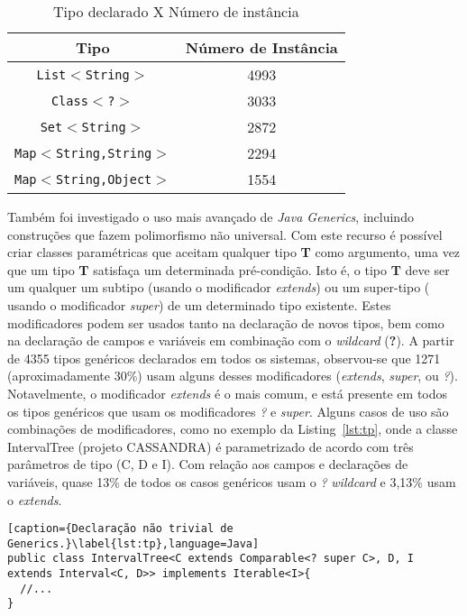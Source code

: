 \begin{table}[ht]
	\centering
	\caption{Tipo declarado X Número de instância}
	\begin{tabular}{cc}
		\hline
		Tipo & Número de Instância\\ 
		\hline \hline
		\texttt{List$<$String$>$} & 4993 \\ 
		\texttt{Class$<$?$>$} & 3033 \\ 
		\texttt{Set$<$String$>$} & 2872 \\ 
		\texttt{Map$<$String,String$>$} & 2294 \\ 
		\texttt{Map$ < $String,Object$>$} & 1554 \\ \hline
	\end{tabular}
	\label{tab:tipoXnumeroInstancia} %
\end{table}

Também foi investigado o uso mais avançado de \textit{Java Generics}, incluindo construções que fazem polimorfismo n\~{a}o universal. Com este recurso é possível criar classes paramétricas que aceitam qualquer tipo \textbf{T} 
como argumento, uma vez que um tipo \textbf{T} satisfaça um determinada 
pré-condição. Isto é, o tipo \textbf{T} deve ser um qualquer um subtipo (usando o modificador \textit{extends}) ou um super-tipo ( usando o modificador \textit{super}) de um determinado tipo existente. Estes modificadores podem 
ser usados tanto na declaração de novos tipos, bem como na declaração de campos e variáveis em combinação com o \textit{wildcard} (\textbf{?}). A partir 
de \num{4355} tipos genéricos declarados em todos os sistemas, 
observou-se que \num{1271} (aproximadamente 30\%) usam alguns 
desses modificadores (\textit{extends}, \textit{super}, ou \textit{?}). Notavelmente, o modificador \textit{extends} é o mais comum, e está presente em todos os tipos genéricos que usam os modificadores \textit{?} e \textit{super}. Alguns casos de uso são combinações de modificadores, como no exemplo da Listing~\ref{lst:tp}, onde a classe IntervalTree (projeto CASSANDRA) é parametrizado de acordo com três parâmetros de tipo (C, D e I). Com relação aos campos e declarações de variáveis, quase 13\% de todos os casos genéricos usam o \textit{?} \textit{wildcard} e 3,13\% usam o \textit{extends}.

\begin{lstlisting}[caption={Declaração não trivial de Generics.}\label{lst:tp},language=Java] 
public class IntervalTree<C extends Comparable<? super C>, D, I extends Interval<C, D>> implements Iterable<I>{
  //...
}
\end{lstlisting}


